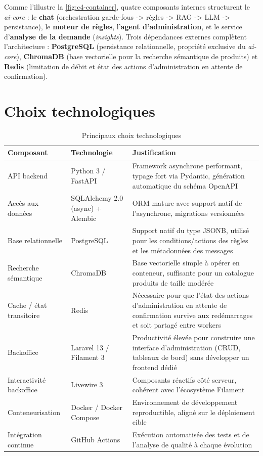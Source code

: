 Comme l'illustre la \cref{fig:c4-container}, quatre composants internes structurent le \emph{ai-core} : le \textbf{chat} (orchestration garde-fous -> règles -> RAG -> LLM -> persistance), le \textbf{moteur de règles}, l'\textbf{agent d'administration}, et le service d'\textbf{analyse de la demande} (\emph{insights}). Trois dépendances externes complètent l'architecture : \textbf{PostgreSQL} (persistance relationnelle, propriété exclusive du \emph{ai-core}), \textbf{ChromaDB} (base vectorielle pour la recherche sémantique de produits) et \textbf{Redis} (limitation de débit et état des actions d'administration en attente de confirmation).

\section{Choix technologiques}

\begin{table}[h]
\centering
\caption{Principaux choix technologiques}
\label{tab:stack}
\begin{tabular}{@{}p{3.5cm}p{4cm}p{6.5cm}@{}}
\toprule
\textbf{Composant} & \textbf{Technologie} & \textbf{Justification} \\
\midrule
API backend & Python 3 / FastAPI & Framework asynchrone performant, typage fort via Pydantic, génération automatique du schéma OpenAPI \\
Accès aux données & SQLAlchemy 2.0 (async) + Alembic & ORM mature avec support natif de l'asynchrone, migrations versionnées \\
Base relationnelle & PostgreSQL & Support natif du type JSONB, utilisé pour les conditions/actions des règles et les métadonnées des messages \\
Recherche sémantique & ChromaDB & Base vectorielle simple à opérer en conteneur, suffisante pour un catalogue produits de taille modérée \\
Cache / état transitoire & Redis & Nécessaire pour que l'état des actions d'administration en attente de confirmation survive aux redémarrages et soit partagé entre workers \\
Backoffice & Laravel 13 / Filament 3 & Productivité élevée pour construire une interface d'administration (CRUD, tableaux de bord) sans développer un frontend dédié \\
Interactivité backoffice & Livewire 3 & Composants réactifs côté serveur, cohérent avec l'écosystème Filament \\
Conteneurisation & Docker / Docker Compose & Environnement de développement reproductible, aligné sur le déploiement cible \\
Intégration continue & GitHub Actions & Exécution automatisée des tests et de l'analyse de qualité à chaque évolution \\
\bottomrule
\end{tabular}
\end{table}

